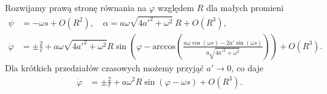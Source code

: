 Rozwijamy prawą stronę równania na $\varphi$ względem $R$ dla małych promieni 
\begin{align*}
\psi &= - \omega s + O(R^2), \quad 
\alpha = a \omega  \sqrt{4 a'^2+\omega ^2} \ R +
 O(R^3), \\
\dot{\varphi} &= \pm \frac{2}{\ell} + 
a \omega  \sqrt{4 a'^2+\omega ^2} R 
\sin \left( \varphi - \text{arccos} \left( 
\frac{a \omega \cos (\omega s) 
- 2 a' \sin (\omega s)}{a\sqrt{4a'^2 + \omega^2}} 
\right) \right) + O(R^3).
\end{align*}
Dla krótkich przedziałów czasowych możemy przyjąć $a' \to 0$, co daje
\begin{align*}
\dot{\varphi} &= \pm \frac{2}{\ell} + 
a \omega ^2 R 
\sin \left( \varphi - \omega s \right) + O(R^3).
\end{align*}


